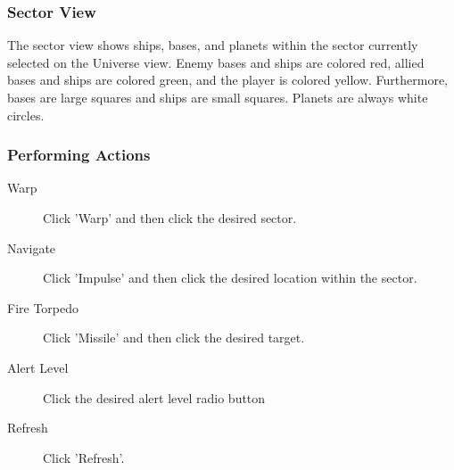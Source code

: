 \subsubsection{Sector View}
The sector view shows ships, bases, and planets within the sector currently selected on the Universe view.
Enemy bases and ships are colored red, allied bases and ships are colored green, and the player is colored yellow.
Furthermore, bases are large squares and ships are small squares.
Planets are always white circles.

\subsubsection{Performing Actions}
\begin{description}
    \item [Warp]
    Click 'Warp' and then click the desired sector.
    \item [Navigate]
    Click 'Impulse' and then click the desired location within the sector.
    \item [Fire Torpedo]
    Click 'Missile' and then click the desired target.
    \item [Alert Level]
    Click the desired alert level radio button
    \item [Refresh]
    Click 'Refresh'.
\end{description}
